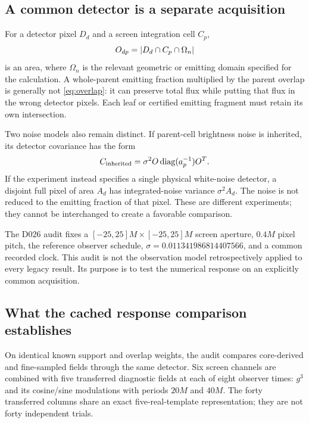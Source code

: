 \subsection{A common detector is a separate acquisition}
For a detector pixel $D_d$ and a screen integration cell $C_p$,
\begin{equation}
O_{dp}=\left\lvert D_d\cap C_p\cap\Omega_n\right\rvert
\label{eq:overlap}
\end{equation}
is an area, where $\Omega_n$ is the relevant geometric or emitting domain specified for the calculation. A whole-parent emitting fraction multiplied by the parent overlap is generally not \eqref{eq:overlap}: it can preserve total flux while putting that flux in the wrong detector pixels. Each leaf or certified emitting fragment must retain its own intersection.

Two noise models also remain distinct. If parent-cell brightness noise is inherited, its detector covariance has the form
\begin{equation}
C_{\rm inherited}=\sigma^2 O\operatorname{diag}(a_p^{-1})O^T.
\label{eq:inherited}
\end{equation}
If the experiment instead specifies a single physical white-noise detector, a disjoint full pixel of area $A_d$ has integrated-noise variance $\sigma^2 A_d$. The noise is not reduced to the emitting fraction of that pixel. These are different experiments; they cannot be interchanged to create a favorable comparison.

The D026 audit fixes a $[-25,25]M\times[-25,25]M$ screen aperture, $0.4M$ pixel pitch, the reference observer schedule, $\sigma=0.011341986814407566$, and a common recorded clock. This audit is not the observation model retrospectively applied to every legacy result. Its purpose is to test the numerical response on an explicitly common acquisition.

\subsection{What the cached response comparison establishes}
On identical known support and overlap weights, the audit compares core-derived and fine-sampled fields through the same detector. Six screen channels are combined with five transferred diagnostic fields at each of eight observer times: $g^3$ and its cosine/sine modulations with periods $20M$ and $40M$. The forty transferred columns share an exact five-real-template representation; they are not forty independent trials.

